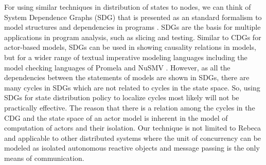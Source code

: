 For using similar techniques in distribution of states to nodes, we can think of System Dependence Graphs (SDG) that is presented as an standard formalism to model structures and dependencies in programs \cite{DBLP:conf/scam/Graf10}. SDGs are the basis for multiple applications in program analysis, such as slicing and testing. Similar to CDGs for actor-based models, SDGs can be used in showing causality relations in models, but for a wider range of textual imperative modeling languages including the model checking languages of Promela \cite{Holzmann:2011:SMC:2029108} and NuSMV \cite{Cimatti:1999:NNS:647768.733923}.
However, as all the dependencies between the statements of models are shown in SDGs, there are many cycles in SDGs which are not related to cycles in the state space. 
So, using SDGs for state distribution policy to localize cycles  most likely will not be practically effective.
The reason that there is a relation among the cycles in the CDG and the state space of an actor model is inherent in the model of computation of actors and their isolation.
Our technique is not limited to Rebeca and applicable to other distributed systems where the unit of concurrency can be modeled as isolated autonomous reactive objects and message passing is the only means of communication. 
%

